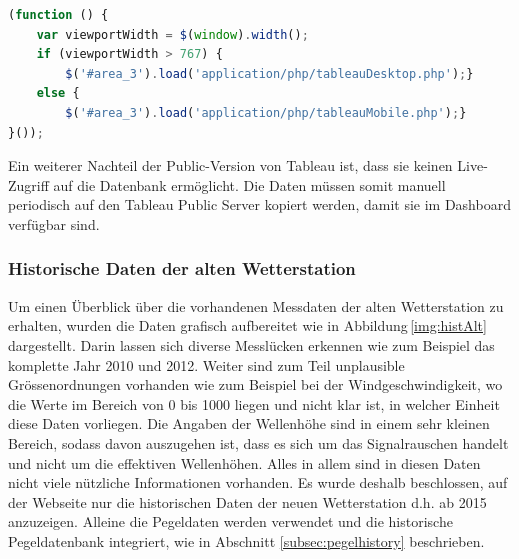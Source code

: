 \vspace{3mm}
\begin{lstlisting}[label=lst:histViewport,caption=Auswahl des Dashboards anhand der Bildschirmgrösse, language=JavaScript, style=htmlcssjs]
(function () {
	var viewportWidth = $(window).width();
	if (viewportWidth > 767) {
		$('#area_3').load('application/php/tableauDesktop.php');}
	else {
		$('#area_3').load('application/php/tableauMobile.php');}
}());
\end{lstlisting}
\vspace{3mm}

\noindent
Ein weiterer Nachteil der Public-Version von Tableau ist, dass sie keinen Live-Zugriff auf die Datenbank ermöglicht. Die Daten müssen somit manuell periodisch auf den Tableau Public Server kopiert werden, damit sie im Dashboard verfügbar sind.



\subsubsection{Historische Daten der alten Wetterstation}
Um einen Überblick über die vorhandenen Messdaten der alten Wetterstation zu erhalten, wurden die Daten grafisch aufbereitet wie in Abbildung\,\ref{img:histAlt} dargestellt. Darin lassen sich diverse Messlücken erkennen wie zum Beispiel das komplette Jahr 2010 und 2012. Weiter sind zum Teil unplausible Grössenordnungen vorhanden wie zum Beispiel bei der Windgeschwindigkeit, wo die Werte im Bereich von 0 bis 1000 liegen und nicht klar ist, in welcher Einheit diese Daten vorliegen. Die Angaben der Wellenhöhe sind in einem sehr kleinen Bereich, sodass davon auszugehen ist, dass es sich um das Signalrauschen handelt und nicht um die effektiven Wellenhöhen. Alles in allem sind in diesen Daten nicht viele nützliche Informationen vorhanden. Es wurde deshalb beschlossen, auf der Webseite nur die historischen Daten der neuen Wetterstation d.h. ab 2015 anzuzeigen. Alleine die Pegeldaten werden verwendet und die historische Pegeldatenbank integriert, wie in Abschnitt \ref{subsec:pegelhistory} beschrieben.

